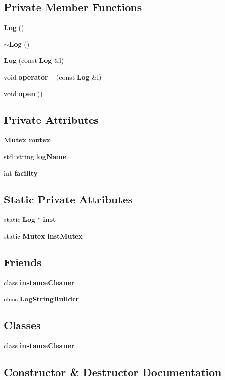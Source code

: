 \subsection*{Private Member Functions}
\begin{CompactItemize}
\item 
{\bf Log} ()
\item 
{\bf $\sim$Log} ()
\item 
{\bf Log} (const {\bf Log} \&l)
\item 
void {\bf operator=} (const {\bf Log} \&l)
\item 
void {\bf open} ()
\end{CompactItemize}
\subsection*{Private Attributes}
\begin{CompactItemize}
\item 
{\bf Mutex} {\bf mutex}
\item 
std::string {\bf log\-Name}
\item 
int {\bf facility}
\end{CompactItemize}
\subsection*{Static Private Attributes}
\begin{CompactItemize}
\item 
static {\bf Log} $\ast$ {\bf inst}
\item 
static {\bf Mutex} {\bf inst\-Mutex}
\end{CompactItemize}
\subsection*{Friends}
\begin{CompactItemize}
\item 
class {\bf instance\-Cleaner}
\item 
class {\bf Log\-String\-Builder}
\end{CompactItemize}
\subsection*{Classes}
\begin{CompactItemize}
\item 
class {\bf instance\-Cleaner}
\end{CompactItemize}


\subsection{Constructor \& Destructor Documentation}
